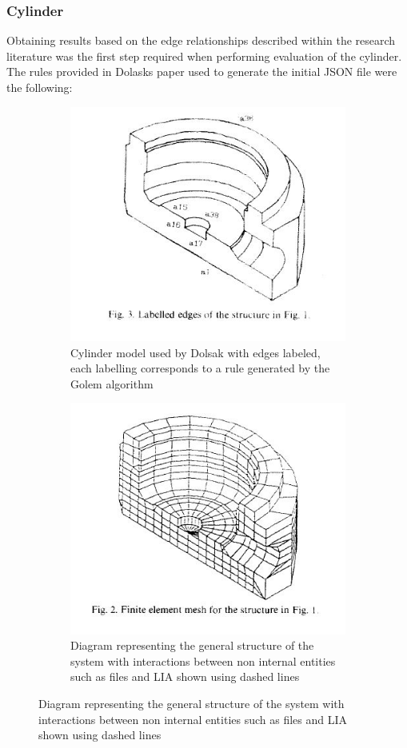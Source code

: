 \documentclass{article}
\begin{document}
\subsubsection{Cylinder}
Obtaining results based on the edge relationships described within the research literature was the first step required when performing evaluation of the cylinder. The rules provided in Dolasks paper used to generate the initial JSON file were the following:




\begin{figure}
\centering
\begin{subfigure}{.5\textwidth}
  \centering
  \includegraphics[width=0.9\linewidth]{DolsakCylinderWithEdges.jpeg}
  \caption{Cylinder model used by Dolsak with edges labeled, each labelling corresponds to a rule generated by the Golem algorithm \cite{DolsakPaper91}}
  \label{fig:sub1}
\end{subfigure}%
\begin{subfigure}{.5\textwidth}
  \centering
  \includegraphics[width=0.9\linewidth]{DolsakCylinderMeshed.jpeg}
  \caption{Diagram representing the general structure of the system with interactions between non internal entities such as files and LIA shown using dashed lines}
  \label{fig:sub2}
\end{subfigure}
\label{fig:test}
\end{figure}
\end{document}
